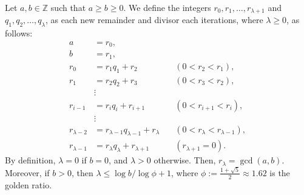 \vspace{-1em}
\begin{Proof}

    \label{proof:euclid_time_complexity}

    Let $a, b \in \mathbb{Z}$ such that $a \geq b \geq 0$. We define the integers $r_0, r_1, \dots, r_{\lambda+1}$ and $q_1, q_2, \dots, q_{\lambda}$, as each new remainder and divisor each iterations, where $\lambda \geq 0$, as follows:
    \[
    \begin{aligned}
        a &= r_0, \\
        b &= r_1, \\
        r_0 &= r_1 q_1 + r_2 &\quad (0 < r_2 < r_1), \\
        r_1 &= r_2 q_2 + r_3 &\quad (0 < r_3 < r_2), \\
            &\vdots \\
        r_{i-1} &= r_i q_i + r_{i+1} &\quad (0 < r_{i+1} < r_i), \\
            &\vdots \\
        r_{\lambda-2} &= r_{\lambda-1} q_{\lambda-1} + r_\lambda &\quad (0 < r_\lambda < r_{\lambda-1}), \\
        r_{\lambda-1} &= r_\lambda q_\lambda + r_{\lambda+1} &\quad (r_{\lambda+1} = 0).
    \end{aligned}
    \]
    \noindent
    By definition, $\lambda = 0$ if $b = 0$, and $\lambda > 0$ otherwise. Then, $r_\lambda = \gcd(a, b)$. Moreover, if $b > 0$, then $\lambda \leq \log b / \log \phi + 1$, where $\phi := \frac{1 + \sqrt{5}}{2} \approx 1.62$ is the golden ratio.
    
\end{Proof}

\newpage 


